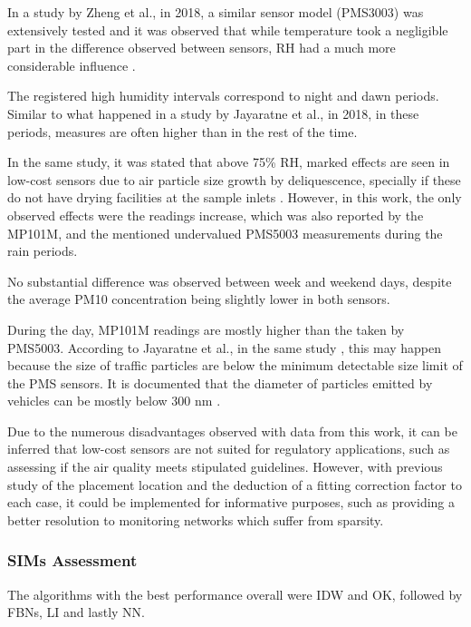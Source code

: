 In a study by Zheng et al., in 2018, a similar sensor model (PMS3003) was extensively tested and it was observed that while temperature took a negligible part in the difference observed between sensors, RH had a much more considerable influence \cite{Zheng2018}. 

The registered high humidity intervals correspond to night and dawn periods. 
Similar to what happened in a study by Jayaratne et al., in 2018, in these periods, measures are often higher than in the rest of the time.

In the same study, it was stated that above 75\% RH, marked effects are seen in low-cost sensors due to air particle size growth by deliquescence, specially if these do not have drying facilities at the sample inlets \cite{Jayaratne2018}. However, in this work, the only observed effects were the readings increase, which was also reported by the MP101M, and the mentioned undervalued PMS5003 measurements during the rain periods.

No substantial difference was observed between week and weekend days, despite the average PM10 concentration being slightly lower in both sensors.

During the day, MP101M readings are mostly higher than the taken by PMS5003.
According to Jayaratne et al., in the same study \cite{Jayaratne2018}, this may happen because the size of traffic particles are below the minimum detectable size limit of the PMS sensors. It is documented that the diameter of particles emitted by vehicles can be mostly below 300 nm \cite{Li2018}.

Due to the numerous disadvantages observed with data from this work, it can be inferred that low-cost sensors are not suited for regulatory applications, such as assessing if the air quality meets stipulated guidelines. However, with previous study of the placement location and the deduction of a fitting correction factor to each case, it could be implemented for informative purposes, such as providing a better resolution to monitoring networks which suffer from sparsity.


\subsubsection{SIMs Assessment}

The algorithms with the best performance overall were IDW and OK, followed by FBNs, LI and lastly NN.

